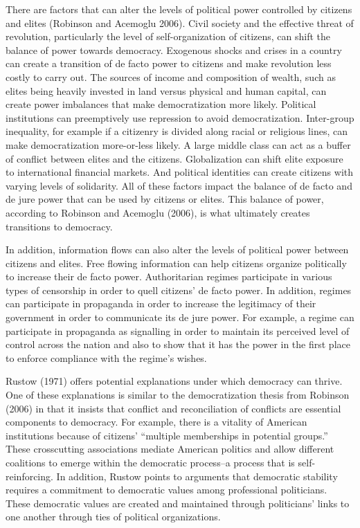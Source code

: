 \documentclass[12pt,]{article}
\begin{document}
There are factors that can alter the levels of political power
controlled by citizens and elites (Robinson and Acemoglu 2006). Civil
society and the effective threat of revolution, particularly the level
of self-organization of citizens, can shift the balance of power towards
democracy. Exogenous shocks and crises in a country can create a
transition of de facto power to citizens and make revolution less costly
to carry out. The sources of income and composition of wealth, such as
elites being heavily invested in land versus physical and human capital,
can create power imbalances that make democratization more likely.
Political institutions can preemptively use repression to avoid
democratization. Inter-group inequality, for example if a citizenry is
divided along racial or religious lines, can make democratization
more-or-less likely. A large middle class can act as a buffer of
conflict between elites and the citizens. Globalization can shift elite
exposure to international financial markets. And political identities
can create citizens with varying levels of solidarity. All of these
factors impact the balance of de facto and de jure power that can be
used by citizens or elites. This balance of power, according to Robinson
and Acemoglu (2006), is what ultimately creates transitions to
democracy.

In addition, information flows can also alter the levels of political
power between citizens and elites. Free flowing information can help
citizens organize politically to increase their de facto power.
Authoritarian regimes participate in various types of censorship in
order to quell citizens' de facto power. In addition, regimes can
participate in propaganda in order to increase the legitimacy of their
government in order to communicate its de jure power. For example, a
regime can participate in propaganda as signalling in order to maintain
its perceived level of control across the nation and also to show that
it has the power in the first place to enforce compliance with the
regime's wishes.

Rustow (1971) offers potential explanations under which democracy can
thrive. One of these explanations is similar to the democratization
thesis from Robinson (2006) in that it insists that conflict and
reconciliation of conflicts are essential components to democracy. For
example, there is a vitality of American institutions because of
citizens' ``multiple memberships in potential groups.'' These
crosscutting associations mediate American politics and allow different
coalitions to emerge within the democratic process--a process that is
self-reinforcing. In addition, Rustow points to arguments that
democratic stability requires a commitment to democratic values among
professional politicians. These democratic values are created and
maintained through politicians' links to one another through ties of
political organizations.
\end{document}
